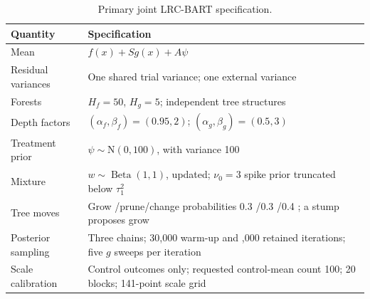 \documentclass[11pt]{article}
\newcommand{\N}{\mathrm{N}}
\theoremstyle{remark}\newtheorem{remark}{Remark}[section]
\providecommand{\DIFaddtex}[1]{{\protect\color{blue} \sf #1}} %
\providecommand{\DIFaddFL}[1]{\DIFadd{#1}} %
\providecommand{\DIFaddbeginFL}{} %
\providecommand{\DIFaddendFL}{} %
\providecommand{\DIFadd}[1]{\texorpdfstring{\DIFaddtex{#1}}{#1}} %
\begin{document}
\begin{table}[htbp]
\centering\small
\caption{ \DIFaddbeginFL \DIFaddFL{Primary joint LRC-BART specification}\DIFaddendFL .}\label{tab:S1}
 \DIFaddbeginFL \begin{tabular}{p{2.0in}p{3.9in}}
\DIFaddendFL \toprule
Quantity &  \DIFaddbeginFL \DIFaddFL{Specification}\DIFaddendFL \\\midrule
 \DIFaddbeginFL \DIFaddFL{Mean }\DIFaddendFL &  \DIFaddbeginFL \DIFaddFL{$f(x)+Sg(x)+A\psi$}\\
\DIFaddFL{Residual variances }& \DIFaddFL{One shared trial variance; one external variance}\\
\DIFaddFL{Forests }& \DIFaddendFL $H_f=50$, $H_g=5$;  \DIFaddbeginFL \DIFaddFL{independent tree structures}\DIFaddendFL \\
 \DIFaddbeginFL \DIFaddFL{Depth factors }\DIFaddendFL &  \DIFaddbeginFL \DIFaddFL{$(\alpha_f,\beta_f)=(0.95,2)$}\DIFaddendFL ; $(\alpha_g,\beta_g)=(0.5,3)$\\
 \DIFaddbeginFL \DIFaddFL{Treatment prior }\DIFaddendFL &  \DIFaddbeginFL \DIFaddFL{$\psi\sim\N(0,100)$, with variance 100}\DIFaddendFL \\
 Mixture  &  \DIFaddbeginFL \DIFaddFL{$w\sim\operatorname{Beta}(1,1)$}\DIFaddendFL , updated;  \DIFaddbeginFL \DIFaddFL{$\nu_0=3$ spike prior truncated below $\tau_1^2$}\DIFaddendFL \\
Tree  \DIFaddbeginFL \DIFaddFL{moves }\DIFaddendFL & Grow \DIFaddbeginFL \DIFaddFL{/prune/change }\DIFaddendFL probabilities 0.3 \DIFaddbeginFL \DIFaddFL{/}\DIFaddendFL 0.3 \DIFaddbeginFL \DIFaddFL{/}\DIFaddendFL 0.4\DIFaddbeginFL \DIFaddFL{; a stump proposes grow}\DIFaddendFL \\
 \DIFaddbeginFL \DIFaddFL{Posterior }\DIFaddendFL sampling &  \DIFaddbeginFL \DIFaddFL{Three chains; 30}\DIFaddendFL ,000 warm-up  and  \DIFaddbeginFL \DIFaddFL{12}\DIFaddendFL ,000 retained  \DIFaddbeginFL \DIFaddFL{iterations; five $g$ sweeps per iteration}\DIFaddendFL \\
 \DIFaddbeginFL \DIFaddFL{Scale calibration }\DIFaddendFL &  \DIFaddbeginFL \DIFaddFL{Control outcomes only; requested control-mean count 100; }\DIFaddendFL 20  \DIFaddbeginFL \DIFaddFL{blocks; 141-point scale grid}\DIFaddendFL \\
 \bottomrule
\end{tabular}
 \end{table}
\end{document}
